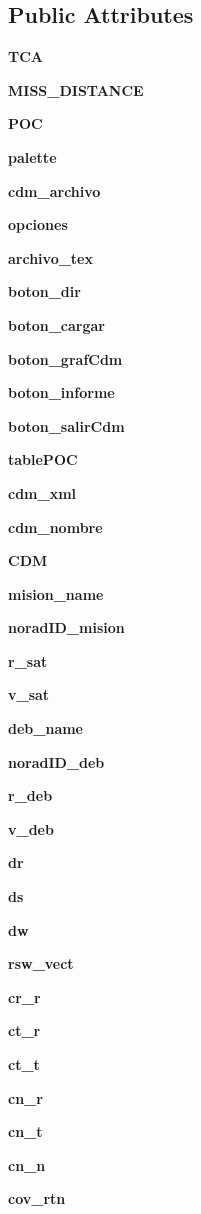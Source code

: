\subsection*{\-Public \-Attributes}
\begin{DoxyCompactItemize}
\item 
{\bf \-T\-C\-A}
\item 
{\bf \-M\-I\-S\-S\-\_\-\-D\-I\-S\-T\-A\-N\-C\-E}
\item 
{\bf \-P\-O\-C}
\item 
{\bf palette}
\item 
{\bf cdm\-\_\-archivo}
\item 
{\bf opciones}
\item 
{\bf archivo\-\_\-tex}
\item 
{\bf boton\-\_\-dir}
\item 
{\bf boton\-\_\-cargar}
\item 
{\bf boton\-\_\-graf\-Cdm}
\item 
{\bf boton\-\_\-informe}
\item 
{\bf boton\-\_\-salir\-Cdm}
\item 
{\bf table\-P\-O\-C}
\item 
{\bf cdm\-\_\-xml}
\item 
{\bf cdm\-\_\-nombre}
\item 
{\bf \-C\-D\-M}
\item 
{\bf mision\-\_\-name}
\item 
{\bf norad\-I\-D\-\_\-mision}
\item 
{\bf r\-\_\-sat}
\item 
{\bf v\-\_\-sat}
\item 
{\bf deb\-\_\-name}
\item 
{\bf norad\-I\-D\-\_\-deb}
\item 
{\bf r\-\_\-deb}
\item 
{\bf v\-\_\-deb}
\item 
{\bf dr}
\item 
{\bf ds}
\item 
{\bf dw}
\item 
{\bf rsw\-\_\-vect}
\item 
{\bf cr\-\_\-r}
\item 
{\bf ct\-\_\-r}
\item 
{\bf ct\-\_\-t}
\item 
{\bf cn\-\_\-r}
\item 
{\bf cn\-\_\-t}
\item 
{\bf cn\-\_\-n}
\item 
{\bf cov\-\_\-rtn}
\end{DoxyCompactItemize}



